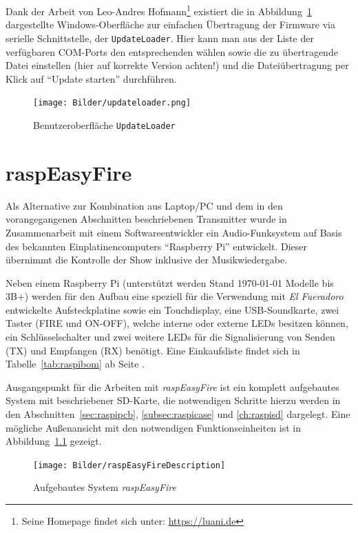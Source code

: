 \documentclass[paper=a4, parskip, numbers=noenddot, toc=listof, headsepline]{scrbook}
\newcommand{\anlage}{\emph{El Fueradoro}}
\newcommand{\REF}{\emph{raspEasyFire}}
\begin{document}
					Dank der Arbeit von Leo-Andres Hofmann\footnote{Seine Homepage findet sich unter: \url{https://luani.de}} existiert die in Abbildung~\ref{fig:updateloader} dargestellte Windows-Oberfläche zur einfachen Übertragung der Firmware via serielle Schnittstelle, der \texttt{UpdateLoader}. Hier kann man aus der Liste der verfügbaren COM-Ports den entsprechenden wählen sowie die zu übertragende Datei einstellen (hier auf korrekte Version achten!) und die Dateiübertragung per Klick auf \enquote{Update starten} durchführen.

					\begin{figure}[!h]
						\centering
						\texttt{[image: Bilder/updateloader.png]}
						\caption{Benutzeroberfläche \texttt{UpdateLoader}}
						\label{fig:updateloader}
					\end{figure}

	\chapter{raspEasyFire}
	\label{ch:raspeasyfire}

		Als Alternative zur Kombination aus Laptop/PC und dem in den vorangegangenen Abschnitten beschriebenen Transmitter wurde in Zusammenarbeit mit einem Softwareentwickler ein Audio-Funksystem auf Basis des bekannten Einplatinencomputers \enquote{Raspberry Pi} entwickelt. Dieser übernimmt die Kontrolle der Show inklusive der Musikwiedergabe.

		Neben einem Raspberry Pi (unterstützt werden Stand {\mmyyyydate\today} Modelle bis 3B+) werden für den Aufbau eine speziell für die Verwendung mit {\anlage} entwickelte Aufsteckplatine sowie ein Touchdisplay, eine USB-Soundkarte, zwei Taster (FIRE und ON-OFF), welche interne oder externe LEDs besitzen können, ein Schlüsselschalter und zwei weitere LEDs für die Signalisierung von Senden (TX) und Empfangen (RX) benötigt. Eine Einkaufsliste findet sich in Tabelle~\ref{tab:raspibom} ab Seite \pageref{tab:raspibom}.

		Ausgangspunkt für die Arbeiten mit {\REF} ist ein komplett aufgebautes System mit beschriebener SD-Karte, die notwendigen Schritte hierzu werden in den Abschnitten~\ref{sec:raspipcb}, \ref{subsec:raspicase} und \ref{ch:raspisd} dargelegt. Eine mögliche Außenansicht mit den notwendigen Funktionseinheiten ist in Abbildung~\ref{fig:raspEasyFireDescription} gezeigt.

		\begin{figure}
			\centering\texttt{[image: Bilder/raspEasyFireDescription]}
			\caption{Aufgebautes System \REF}
			\label{fig:raspEasyFireDescription}
		\end{figure}
\end{document}
